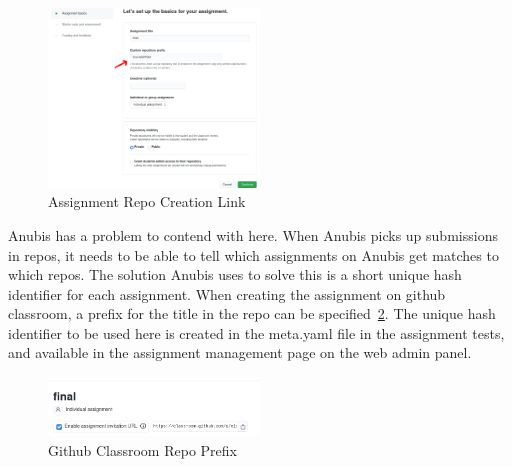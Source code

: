 \begin{figure}
    \centering
    \includegraphics[width=0.5\textwidth]{figures/github-classroom-1}
    \caption{Assignment Repo Creation Link\label{fig:github-classroom-1}}
\end{figure}

Anubis has a problem to contend with here.
When Anubis picks up submissions in repos, it needs to be able
to tell which assignments on Anubis get matches to which repos.
The solution Anubis uses to solve this is a short unique hash identifier 
for each assignment.
When creating the assignment on github classroom, a prefix for the title in the repo
can be specified~\ref{fig:github-classroom-2}.
The unique hash identifier to be used here is created in the meta.yaml file in the assignment
tests, and available in the assignment management page on the web admin panel.

\begin{figure}[ht]
    \centering
    \includegraphics[width=0.5\textwidth]{figures/github-classroom-2}
    \caption{Github Classroom Repo Prefix\label{fig:github-classroom-2}}
\end{figure}

